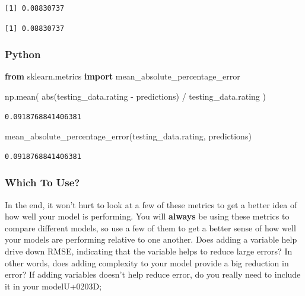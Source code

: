 \documentclass[
  letterpaper,
]{krantz}
\newenvironment{Shaded}{}{}
\newcommand{\BuiltInTok}[1]{\textcolor[rgb]{0.00,0.50,0.00}{#1}}
\newcommand{\FunctionTok}[1]{\textcolor[rgb]{0.02,0.16,0.49}{#1}}
\newcommand{\ImportTok}[1]{\textcolor[rgb]{0.00,0.50,0.00}{\textbf{#1}}}
\newcommand{\NormalTok}[1]{#1}
\newcommand{\OperatorTok}[1]{\textcolor[rgb]{0.40,0.40,0.40}{#1}}
\newcommand{\SpecialCharTok}[1]{\textcolor[rgb]{0.25,0.44,0.63}{#1}}
\begin{document}
\begin{verbatim}
[1] 0.08830737
\end{verbatim}

\begin{Shaded}
\end{Shaded}

\begin{verbatim}
[1] 0.08830737
\end{verbatim}

\subsubsection{Python}

\begin{Shaded}
\begin{Highlighting}[]
\ImportTok{from}\NormalTok{ sklearn.metrics }\ImportTok{import}\NormalTok{ mean\_absolute\_percentage\_error}

\NormalTok{np.mean(}
    \BuiltInTok{abs}\NormalTok{(testing\_data.rating }\OperatorTok{{-}}\NormalTok{ predictions) }\OperatorTok{/} 
\NormalTok{    testing\_data.rating}
\NormalTok{)}
\end{Highlighting}
\end{Shaded}

\begin{verbatim}
0.0918768841406381
\end{verbatim}

\begin{Shaded}
\begin{Highlighting}[]
\NormalTok{mean\_absolute\_percentage\_error(testing\_data.rating, predictions)}
\end{Highlighting}
\end{Shaded}

\begin{verbatim}
0.0918768841406381
\end{verbatim}

\subsubsection{Which To Use?}\label{which-to-use}

In the end, it won't hurt to look at a few of these metrics to get a
better idea of how well your model is performing. You will
\textbf{always} be using these metrics to compare different models, so
use a few of them to get a better sense of how well your models are
performing relative to one another. Does adding a variable help drive
down RMSE, indicating that the variable helps to reduce large errors? In
other words, does adding complexity to your model provide a big
reduction in error? If adding variables doesn't help reduce error, do
you really need to include it in your modelU+0203D;
\end{document}
